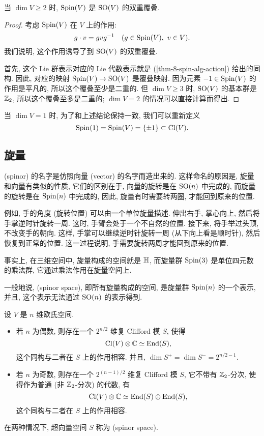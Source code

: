 \begin{proposition}
    当 $\dim V \geq 2$ 时, $\mathrm{Spin} (V)$ 是 $\mathrm{SO} (V)$ 的双重覆叠.
\end{proposition}

\begin{proof}
    考虑 $\mathrm{Spin} (V)$ 在 $V$ 上的作用:
    \[ g \cdot v = g v g^{-1} \quad (g \in \mathrm{Spin} (V), \ v \in V). \]
    我们说明, 这个作用诱导了到 $\mathrm{SO} (V)$ 的双重覆叠.
    
    首先, 这个 Lie 群表示对应的 Lie 代数表示就是 (\ref{thm-8-spin-alg-action}) 给出的同构.
    因此, 对应的映射 $\mathrm{Spin} (V) \to \mathrm{SO} (V)$ 是覆叠映射.
    因为元素 $-1 \in \mathrm{Spin} (V)$ 的作用是平凡的, 所以这个覆叠至少是二重的.
    但 $\dim V \geq 3$ 时, $\mathrm{SO} (V)$ 的基本群是 $\mathbb{Z}_2$, 所以这个覆叠至多是二重的;
    $\dim V = 2$ 的情况可以直接计算而得出.
\end{proof}

当 $\dim V = 1$ 时, 为了和上述结论保持一致, 我们可以重新定义
\[ \mathrm{Spin} (1) = \mathrm{Spin} (V) = \{ \pm 1 \} \subset \operatorname{Cl} (V). \]


\subsection{旋量}

 (spinor) 的名字是仿照向量 (vector) 的名字而造出来的.
这样命名的原因是, 旋量和向量有类似的性质, 它们的区别在于,
向量的旋转是在 $\mathrm{SO} (n)$ 中完成的, 而旋量的旋转是在 $\mathrm{Spin} (n)$ 中完成的,
因此, 旋量有时需要转两圈, 才能回到原来的位置.

例如, 手的角度 (旋转位置) 可以由一个单位旋量描述.
伸出右手, 掌心向上, 然后将手掌逆时针旋转一周.
这时, 手臂会处于一个不自然的位置.
接下来, 将手举过头顶, 不改变手的朝向.
这样, 手掌可以继续逆时针旋转一周 (从下向上看是顺时针),
然后恢复到正常的位置.
这一过程说明, 手需要旋转两周才能回到原来的位置.

事实上, 在三维空间中, 旋量构成的空间就是 $\mathbb{H}$,
而旋量群 $\mathrm{Spin} (3)$ 是单位四元数的乘法群, 它通过乘法作用在旋量空间上.

一般地说,  (spinor space), 即所有旋量构成的空间,
是旋量群 $\mathrm{Spin} (n)$ 的一个表示, 并且, 这个表示无法通过 $\mathrm{SO} (n)$ 的表示得到.

\begin{theorem} \label{thm-8-def-spinor}
    设 $V$ 是 $n$ 维欧氏空间.
    \begin{itemize}
        \item
            若 $n$ 为偶数, 则存在一个 $2^{n/2}$ 维复 Clifford 模 $S$, 使得
            \[ \operatorname{Cl} (V) \otimes \mathbb{C} \simeq \operatorname{End} (S), \]
            这个同构与二者在 $S$ 上的作用相容.
            并且, $\dim S^+ = \dim S^- = 2^{n/2-1}$.
        \item 
            若 $n$ 为奇数, 则存在一个 $2^{(n-1)/2}$ 维复 Clifford 模 $S$,
            它不带有 $\mathbb{Z}_2$-分次, 使得作为普通 (非 $\mathbb{Z}_2$-分次) 的代数, 有
            \[ \operatorname{Cl} (V) \otimes \mathbb{C} \simeq \operatorname{End} (S) \oplus \operatorname{End} (S), \]
            这个同构与二者在 $S$ 上的作用相容.
    \end{itemize}
    在两种情况下, 超向量空间 $S$ 称为 (spinor space).
\end{theorem}

